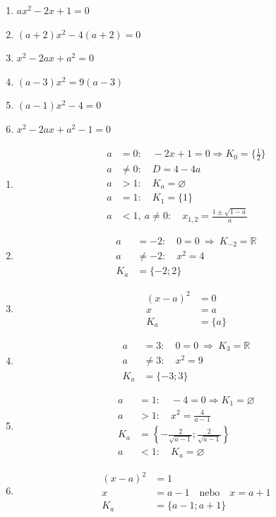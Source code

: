 \documentclass[11pt,a4paper]{article}
\begin{document}
\begin{zadaniReseniBox}[title={Domácí úkol}]
\begin{enumerate}[label=\alph*),itemsep=2pt]
\item $ax^2-2x+1=0$
\item $(a+2)x^2-4(a+2)=0$
\item $x^2-2ax+a^2=0$
\item $(a-3)x^2=9(a-3)$
\item $(a-1)x^2-4=0$
\item $x^2-2ax+a^2-1=0$
\end{enumerate}
\tcblower
\begin{enumerate}[label=\alph*),itemsep=2pt]
\item
\[\begin{aligned}
a&=0:\quad -2x+1=0\Rightarrow K_0=\{\tfrac12\}\\[2pt]
a&\ne0:\quad D=4-4a\\[2pt]
a&>1:\quad K_a=\varnothing\\[2pt]
a&=1:\quad K_1=\{1\}\\[2pt]
a&<1,\ a\ne0:\quad x_{1,2}=\frac{1\pm\sqrt{1-a}}a
\end{aligned}\]
\item
\[\begin{aligned}
a&=-2:\quad 0=0\ \Rightarrow\ K_{-2}=\mathbb R\\[2pt]
a&\ne-2:\quad x^2=4\\[2pt]
K_a&=\{-2;2\}
\end{aligned}\]
\item
\[\begin{aligned}
(x-a)^2&=0\\[2pt]
x&=a\\[2pt]
K_a&=\{a\}
\end{aligned}\]
\item
\[\begin{aligned}
a&=3:\quad 0=0\ \Rightarrow\ K_3=\mathbb R\\[2pt]
a&\ne3:\quad x^2=9\\[2pt]
K_a&=\{-3;3\}
\end{aligned}\]
\item
\[\begin{aligned}
a&=1:\quad -4=0\Rightarrow K_1=\varnothing\\[2pt]
a&>1:\quad x^2=\frac4{a-1}\\[2pt]
K_a&=\left\{-\frac2{\sqrt{a-1}};\frac2{\sqrt{a-1}}\right\}\\[2pt]
a&<1:\quad K_a=\varnothing
\end{aligned}\]
\item
\[\begin{aligned}
(x-a)^2&=1\\[2pt]
x&=a-1\quad\text{nebo}\quad x=a+1\\[2pt]
K_a&=\{a-1;a+1\}
\end{aligned}\]
\end{enumerate}
\end{zadaniReseniBox}
\end{document}
